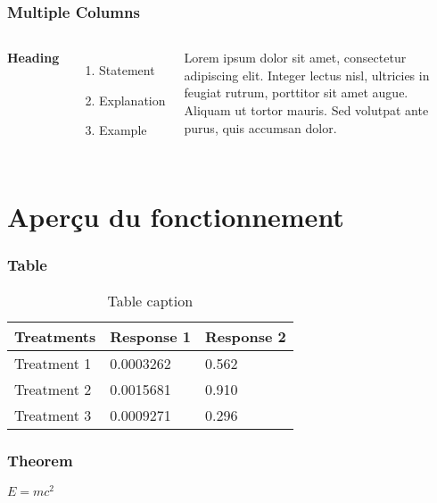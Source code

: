 \documentclass{beamer}
\begin{document}

\begin{frame}
\frametitle{Multiple Columns}
\begin{columns}[c] %

\textbf{Heading}
\begin{enumerate}
\item Statement
\item Explanation
\item Example
\end{enumerate}

Lorem ipsum dolor sit amet, consectetur adipiscing elit. Integer lectus nisl, ultricies in feugiat rutrum, porttitor sit amet augue. Aliquam ut tortor mauris. Sed volutpat ante purus, quis accumsan dolor.

\end{columns}
\end{frame}

\section{Aperçu du fonctionnement}

\begin{frame}
\frametitle{Table}
\begin{table}
\begin{tabular}{l l l}
\toprule
\textbf{Treatments} & \textbf{Response 1} & \textbf{Response 2}\\
\midrule
Treatment 1 & 0.0003262 & 0.562 \\
Treatment 2 & 0.0015681 & 0.910 \\
Treatment 3 & 0.0009271 & 0.296 \\
\bottomrule
\end{tabular}
\caption{Table caption}
\end{table}
\end{frame}


\begin{frame}
\frametitle{Theorem}
\begin{theorem}
$E = mc^2$
\end{theorem}
\end{frame}
\end{document}
